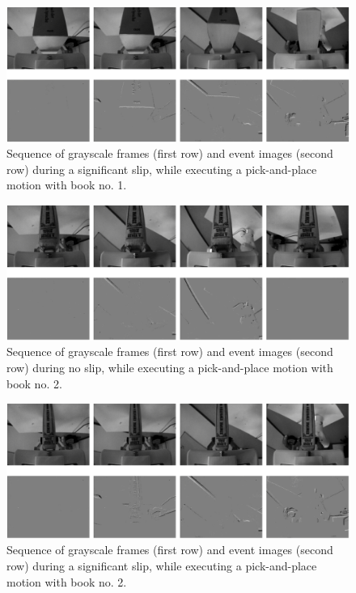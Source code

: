 \begin{figure}[H]
    \centering
    \includegraphics[width=\textwidth]{resources/images/set2_case3}
    \caption{Sequence of grayscale frames (first row) and event images (second row) during a significant slip, while executing a pick-and-place motion with book no. 1.}\label{fig:set2_case3}
\end{figure}

\begin{figure}[H]
    \centering
    \includegraphics[width=\textwidth]{resources/images/set2_case4}
    \caption{Sequence of grayscale frames (first row) and event images (second row) during no slip, while executing a pick-and-place motion with book no. 2.}\label{fig:set2_case4}
\end{figure}

\begin{figure}[H]
    \centering
    \includegraphics[width=\textwidth]{resources/images/set2_case5}
    \caption{Sequence of grayscale frames (first row) and event images (second row) during a significant slip, while executing a pick-and-place motion with book no. 2.}\label{fig:set2_case5}
\end{figure}

